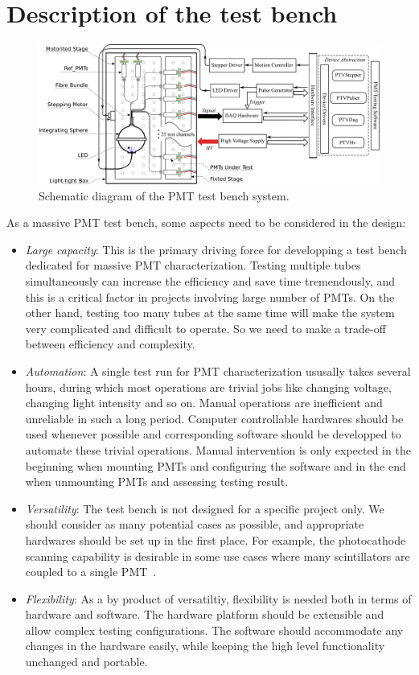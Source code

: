 \documentclass[5p, times]{elsarticle}
\begin{document}
\section{Description of the test bench}
\label{sec:description}

\begin{figure}
 \centering
 \includegraphics[width=160mm]{testbench_overview}
\caption{Schematic diagram of the PMT test bench system.}
\label{fig:testbench_overveiw}
\end{figure}

As a massive PMT test bench, some aspects need to be considered in the design:
\begin{itemize}
 \item \textit{Large capacity}: This is the primary driving force for developping a test bench dedicated for massive PMT characterization.
 Testing multiple tubes simultaneously can increase the efficiency and save time tremendously, and this is a critical factor in projects involving large number of PMTs. 
 On the other hand, testing too many tubes at the same time will make the system very complicated and difficult to operate. 
 So we need to make a trade-off between efficiency and complexity.
 \item \textit{Automation}: A single test run for PMT characterization ususally takes several hours, during which most operations are trivial jobs like changing voltage, changing light intensity and so on.
 Manual operations are inefficient and unreliable in such a long period.
 Computer controllable hardwares should be used whenever possible and corresponding software should be developped to automate these trivial operations.
 Manual intervention is only expected in the beginning when mounting PMTs and configuring the software and in the end when unmounting PMTs and assessing testing result. 
 \item \textit{Versatility}: The test bench is not designed for a specific project only.
 We should consider as many potential cases as possible, and appropriate hardwares should be set up in the first place.
 For example, the photocathode scanning capability is desirable in some use cases where many scintillators are coupled to a single PMT~\cite{tof_pet}. 
 \item \textit{Flexibility}: As a by product of versatiltiy, flexibility is needed both in terms of hardware and software.
 The hardware platform should be extensible and allow complex testing configurations.
 The software should accommodate any changes in the hardware easily, while keeping the high level functionality unchanged and portable. 
\end{itemize}
\end{document}
